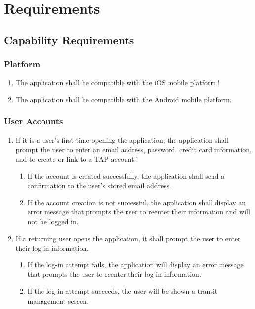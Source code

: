 \section{Requirements}
\subsection{Capability Requirements}

	\subsubsection{Platform}\begin{enumerate}
		\item The application shall be compatible with the iOS mobile platform.!
		\item The application shall be compatible with the Android mobile platform.
	\end{enumerate}
	
	\subsubsection{User Accounts}\begin{enumerate}
		\item If it is a user’s first-time opening the application, the application shall prompt the user to enter an email address, password, credit card information, and to create or link to a TAP account.!
		\begin{enumerate}
			\item If the account is created successfully, the application shall send a confirmation to the user’s stored email address.
			\item If the account creation is not successful, the application shall display an error message that prompts the user to reenter their information and will not be logged in.
		\end{enumerate}
		\item If a returning user opens the application, it shall prompt the user to enter their log-in information.
			\begin{enumerate}
				\item If the log-in attempt fails, the application will display an error message that prompts the user to reenter their log-in information.
				\item If the log-in attempt succeeds, the user will be shown a transit management screen.
			\end{enumerate}
	\end{enumerate}
	
